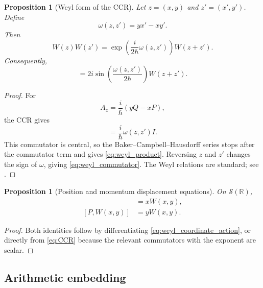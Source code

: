 \documentclass[11pt]{amsart}
\numberwithin{equation}{section}
\theoremstyle{plain}
\newtheorem{proposition}[theorem]{Proposition}
\theoremstyle{definition}
\theoremstyle{remark}
\newcommand{\R}{\mathbb{R}}
\newcommand{\Sch}{\mathcal{S}}
\begin{document}
\begin{proposition}[Weyl form of the CCR]
\label{prop:weyl_relation}
Let $z=(x,y)$ and $z'=(x',y')$.  Define
\begin{equation}
\omega(z,z')=yx'-xy'.
\label{eq:symplectic_form}
\end{equation}
Then
\begin{equation}
W(z)W(z')
=
\exp\!\left(\frac{i}{2\hbar}\omega(z,z')\right)
W(z+z').
\label{eq:weyl_product}
\end{equation}
Consequently,
\begin{equation}
[W(z),W(z')]
=
2i\sin\!\left(\frac{\omega(z,z')}{2\hbar}\right)W(z+z').
\label{eq:weyl_commutator}
\end{equation}
\end{proposition}

\begin{proof}
For
\begin{equation}
A_z=\frac{i}{\hbar}(yQ-xP),
\label{eq:Az_definition}
\end{equation}
the CCR gives
\begin{equation}
[A_z,A_{z'}]
=
\frac{i}{\hbar}\omega(z,z')I.
\label{eq:Az_commutator}
\end{equation}
This commutator is central, so the Baker--Campbell--Hausdorff series stops
after the commutator term and gives \eqref{eq:weyl_product}.  Reversing $z$
and $z'$ changes the sign of $\omega$, giving \eqref{eq:weyl_commutator}.
The Weyl relations are standard; see \cite{Folland1989}.
\end{proof}

\begin{proposition}[Position and momentum displacement equations]
\label{prop:weyl_QP_commutators}
On $\Sch(\R)$,
\begin{align}
[Q,W(x,y)]
&=xW(x,y),
\label{eq:Q_W_commutator}\\
[P,W(x,y)]
&=yW(x,y).
\label{eq:P_W_commutator}
\end{align}
\end{proposition}

\begin{proof}
Both identities follow by differentiating \eqref{eq:weyl_coordinate_action},
or directly from \eqref{eq:CCR} because the relevant commutators with the
exponent are scalar.
\end{proof}

\subsection{Arithmetic embedding}
\label{subsec:arithmetic_embedding}
\end{document}
